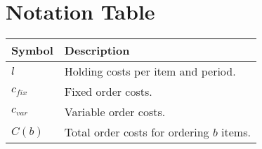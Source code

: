 \chapter{Notation Table}

\begin{longtable}{ll}
		\toprule
		\textbf{Symbol} & \textbf{Description} \\
		\midrule
		$l$ & Holding costs per item and period. \\
		$c_{fix}$ & Fixed order costs. \\
		$c_{var}$ & Variable order costs. \\
		$C(b)$ & Total order costs for ordering $b$ items. \\
		

\end{longtable}
